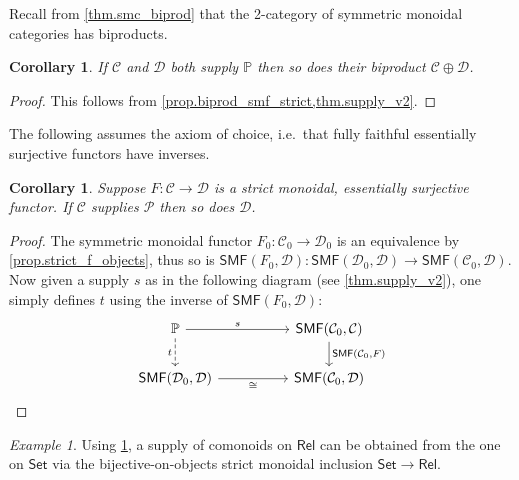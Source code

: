 \documentclass[11pt, oneside, article]{memoir}
\theoremstyle{plain}
\newtheorem{corollary}[theorem]{Corollary}
\theoremstyle{definition}
\theoremstyle{remark}
\newtheorem{example}[theorem]{Example}
\newcommand{\cat}[1]{\mathcal{#1}}%
\newcommand{\Cat}[1]{{\mathsf{#1}}}%
\newcommand{\smset}{\Cat{Set}}
\newcommand{\smf}{\Cat{SMF}}
\newcommand{\pp}{\mathbb{P}}
\newcommand{\mob}[1]{#1_0}
\newcommand{\rel}{\Cat{Rel}}
\begin{document}
Recall from \cref{thm.smc_biprod} that the 2-category of symmetric monoidal categories has biproducts.

\begin{corollary}
If $\cat{C}$ and $\cat{D}$ both supply $\pp$ then so does their biproduct $\cat{C}\oplus\cat{D}$.
\end{corollary}
\begin{proof}
This follows from \cref{prop.biprod_smf_strict,thm.supply_v2}.
\end{proof}

The following assumes the axiom of choice, i.e.\ that fully faithful essentially surjective functors have inverses.

\begin{corollary}\label{cor.strong_bo}
Suppose $F\colon\cat{C}\to\cat{D}$ is a strict monoidal, essentially surjective functor. If $\cat{C}$ supplies $\cat{P}$ then so does $\cat{D}$.
\end{corollary}
\begin{proof}
The symmetric monoidal functor $\mob{F}\colon\mob{\cat{C}}\to\mob{\cat{D}}$ is an equivalence by \cref{prop.strict_f_objects}, thus so is $\smf(\mob{F},\cat{D})\colon\smf(\mob{\cat{D}},\cat{D})\to\smf(\mob{\cat{C}},\cat{D})$. Now given a supply $s$ as in the following diagram (see \cref{thm.supply_v2}), one simply defines $t$ using the inverse of $\smf(\mob{F},\cat{D})$:
\[
\begin{tikzcd}[column sep=50pt]
	\pp\ar[r, "s"]\ar[d, dashed, "t"']&
	\smf(\mob{\cat{C}},\cat{C})\ar[d, "{\smf(\mob{\cat{C}},F)}"]\\
	\smf(\mob{\cat{D}},\cat{D})\ar[r, "\cong"']&
	\smf(\mob{\cat{C}},\cat{D})
\end{tikzcd}
\qedhere
\]
\end{proof}

\begin{example}
Using \cref{cor.strong_bo}, a supply of comonoids on $\rel$ can be obtained from the one on $\smset$ via the bijective-on-objects strict monoidal inclusion $\smset\to\rel$.
\end{example}
\end{document}
